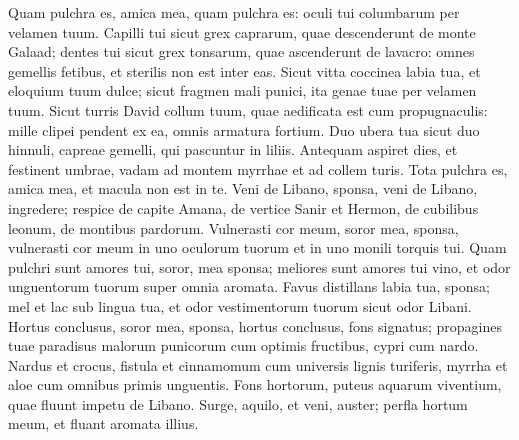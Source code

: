\begin{biblechapter}
\begin{biblechapter}
\begin{biblechapter}
\begin{biblechapter}
\verse Quam pulchra es, amica mea,
 quam pulchra es:
 oculi tui columbarum
 per velamen tuum.
 Capilli tui sicut grex caprarum,
 quae descenderunt de monte Galaad;
 \verse dentes tui sicut grex tonsarum,
 quae ascenderunt de lavacro:
 omnes gemellis fetibus,
 et sterilis non est inter eas.
 \verse Sicut vitta coccinea labia tua,
 et eloquium tuum dulce;
 sicut fragmen mali punici, ita genae tuae
 per velamen tuum.
 \verse Sicut turris David collum tuum,
 quae aedificata est cum propugnaculis:
 mille clipei pendent ex ea,
 omnis armatura fortium.
 \verse Duo ubera tua sicut duo hinnuli,
 capreae gemelli,
 qui pascuntur in liliis.
 \verse Antequam aspiret dies,
 et festinent umbrae,
 vadam ad montem myrrhae
 et ad collem turis.
 \verse Tota pulchra es, amica mea,
 et macula non est in te.
 \verse Veni de Libano, sponsa,
 veni de Libano,
 ingredere;
 respice de capite Amana,
 de vertice Sanir et Hermon,
 de cubilibus leonum,
 de montibus pardorum.
 \verse Vulnerasti cor meum, soror mea, sponsa,
 vulnerasti cor meum in uno oculorum tuorum
 et in uno monili torquis tui.
 \verse Quam pulchri sunt amores tui, soror, mea sponsa;
 meliores sunt amores tui vino,
 et odor unguentorum tuorum super omnia aromata.
 \verse Favus distillans labia tua, sponsa;
 mel et lac sub lingua tua,
 et odor vestimentorum tuorum
 sicut odor Libani.
 \verse Hortus conclusus, soror mea, sponsa,
 hortus conclusus, fons signatus;
 \verse propagines tuae paradisus malorum punicorum
 cum optimis fructibus,
 cypri cum nardo.
 \verse Nardus et crocus,
 fistula et cinnamomum
 cum universis lignis turiferis,
 myrrha et aloe
 cum omnibus primis unguentis.
 \verse Fons hortorum,
 puteus aquarum viventium,
 quae fluunt impetu de Libano.
 \verse Surge, aquilo,
 et veni, auster;
 perfla hortum meum,
 et fluant aromata illius.
 

\end{biblechapter}
\end{biblechapter}
\end{biblechapter}
\end{biblechapter}
